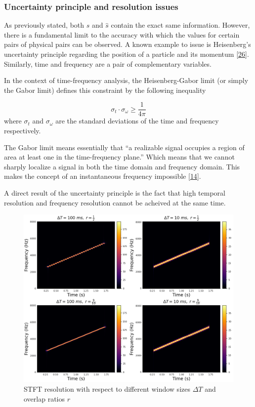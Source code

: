 \documentclass[american,]{article}
\theoremstyle{definition}
\theoremstyle{definition}
\theoremstyle{definition}
\theoremstyle{remark}
\begin{document}
\hypertarget{uncertainty-principle-and-resolution-issues}{%
\subsubsection{Uncertainty principle and resolution issues}\label{uncertainty-principle-and-resolution-issues}}

As previously stated, both \(s\) and \(\hat s\) contain the exact same information.
However, there is a fundamental limit to the accuracy with which the values
for certain pairs of physical pairs can be observed.
A known example to issue is Heisenberg's uncertainty principle regarding
the position of a particle and its momentum {[}\protect\hyperlink{ref-sen2014}{26}{]}.
Similarly, time and frequency are a pair of complementary variables.

In the context of time-frequency analysis, the Heisenberg-Gabor limit
(or simply the Gabor limit) defines this constraint by the following inequality

\begin{equation}
\sigma_t\cdot\sigma_\omega\geq \frac{1}{4\pi}
\end{equation}
where \(\sigma_t\) and \(\sigma_\omega\) are the standard deviations of the time and frequency respectively.

The Gabor limit means essentially that
``a realizable signal occupies a region of area at least one in the time-frequency plane.''
Which means that we cannot sharply localize a signal in both the time domain and frequency domain.
This makes the concept of an instantaneous frequency impossible {[}\protect\hyperlink{ref-grochenig2001}{14}{]}.

A direct result of the uncertainty principle is the fact that high temporal resolution
and frequency resolution cannot be acheived at the same time.

\begin{figure}
\centering
\includegraphics{img/stft_resolution.png}
\caption{STFT resolution with respect to different window sizes \(\Delta T\) and overlap ratios \(r\)}
\end{figure}
\end{document}
